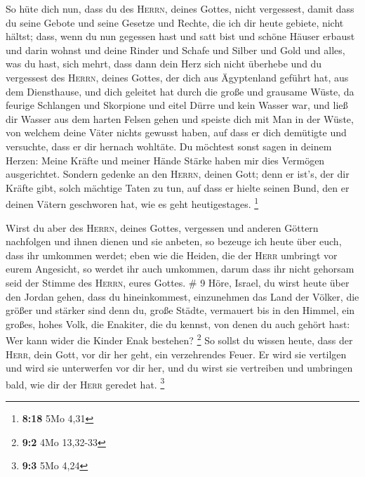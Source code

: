  So hüte dich nun, dass du des \textsc{Herrn}, deines
Gottes, nicht vergessest, damit dass du seine Gebote und seine Gesetze
und Rechte, die ich dir heute gebiete, nicht hältst; 
dass, wenn du nun gegessen hast und satt bist und schöne Häuser erbaust
und darin wohnst  und deine Rinder und Schafe und Silber
und Gold und alles, was du hast, sich mehrt,  dass dann
dein Herz sich nicht überhebe und du vergessest des \textsc{Herrn},
deines Gottes, der dich aus Ägyptenland geführt hat, aus dem
Diensthause,  und dich geleitet hat durch die große und
grausame Wüste, da feurige Schlangen und Skorpione und eitel Dürre und
kein Wasser war, und ließ dir Wasser aus dem harten Felsen gehen
 und speiste dich mit Man in der Wüste, von welchem deine
Väter nichts gewusst haben, auf dass er dich demütigte und versuchte,
dass er dir hernach wohltäte.  Du möchtest sonst sagen in
deinem Herzen: Meine Kräfte und meiner Hände Stärke haben mir dies
Vermögen ausgerichtet.  Sondern gedenke an den
\textsc{Herrn}, deinen Gott; denn er ist's, der dir Kräfte gibt, solch
mächtige Taten zu tun, auf dass er hielte seinen Bund, den er deinen
Vätern geschworen hat, wie es geht heutigestages. \footnote{\textbf{8:18}
  5Mo 4,31}

 Wirst du aber des \textsc{Herrn}, deines Gottes,
vergessen und anderen Göttern nachfolgen und ihnen dienen und sie
anbeten, so bezeuge ich heute über euch, dass ihr umkommen werdet;
 eben wie die Heiden, die der \textsc{Herr} umbringt vor
eurem Angesicht, so werdet ihr auch umkommen, darum dass ihr nicht
gehorsam seid der Stimme des \textsc{Herrn}, eures Gottes. \# 9
 Höre, Israel, du wirst heute über den Jordan gehen, dass
du hineinkommest, einzunehmen das Land der Völker, die größer und
stärker sind denn du, große Städte, vermauert bis in den Himmel,
 ein großes, hohes Volk, die Enakiter, die du kennst, von
denen du auch gehört hast: Wer kann wider die Kinder Enak bestehen?
\footnote{\textbf{9:2} 4Mo 13,32-33}  So sollst du wissen
heute, dass der \textsc{Herr}, dein Gott, vor dir her geht, ein
verzehrendes Feuer. Er wird sie vertilgen und wird sie unterwerfen vor
dir her, und du wirst sie vertreiben und umbringen bald, wie dir der
\textsc{Herr} geredet hat. \footnote{\textbf{9:3} 5Mo 4,24}

